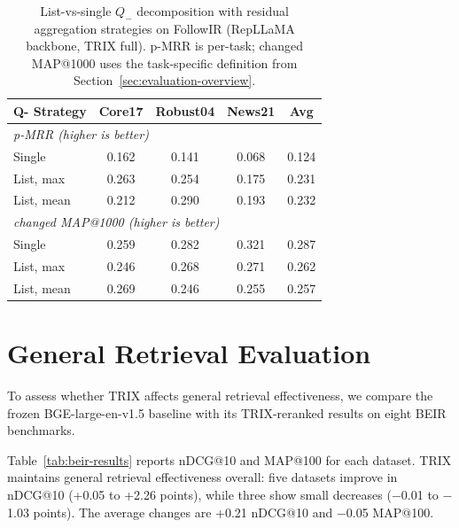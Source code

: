 \documentclass[letterpaper]{article}
\newcommand{\method}{\ifmmode \mathrm{TRIX}\else TRIX\xspace\fi}
\newcommand{\qminus}{Q_{-}}
\begin{document}
\begin{table}[t]
\centering
\small
\setlength{\tabcolsep}{3pt}
\begin{tabular}{l cccc}
\toprule
\textbf{Q- Strategy} &
\textbf{Core17} & \textbf{Robust04} & \textbf{News21} &
\textbf{Avg} \\
\midrule
\multicolumn{5}{l}{\emph{p-MRR (higher is better)}} \\
\quad Single & 0.162 & 0.141 & 0.068 & 0.124 \\
\quad List, max   & 0.263 & 0.254 & 0.175 & 0.231 \\
\quad List, mean  & 0.212 & 0.290 & 0.193 & 0.232 \\
\midrule
\multicolumn{5}{l}{\emph{changed MAP@1000 (higher is better)}} \\
\quad Single & 0.259 & 0.282 & 0.321 & 0.287 \\
\quad List, max   & 0.246 & 0.268 & 0.271 & 0.262 \\
\quad List, mean  & 0.269 & 0.246 & 0.255 & 0.257 \\
\bottomrule
\end{tabular}
\caption{List-vs-single $\qminus$ decomposition with residual
aggregation strategies on FollowIR (RepLLaMA backbone, \method{} full).
p-MRR is per-task; changed MAP@1000 uses the task-specific definition
from Section~\ref{sec:evaluation-overview}.}
\label{tab:list-vs-single}
\end{table}

\section{General Retrieval Evaluation}
\label{app:beir}

To assess whether \method{} affects general retrieval effectiveness, we compare
the frozen BGE-large-en-v1.5 baseline with its \method-reranked results on eight
BEIR benchmarks.

Table~\ref{tab:beir-results} reports nDCG@10 and MAP@100 for each dataset.
\method{} maintains general retrieval effectiveness overall: five datasets
improve in nDCG@10 (+0.05 to +2.26 points), while three show small decreases
($-$0.01 to $-$1.03 points).  The average changes are +0.21 nDCG@10 and
$-$0.05 MAP@100.
\end{document}
